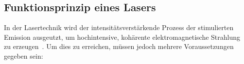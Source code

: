    
    \subsection{Funktionsprinzip eines Lasers}
        In der Lasertechnik wird der intensitätsverstärkende Prozess der stimulierten Emission ausgeutzt, um hochintensive, kohärente elektromagnetische Strahlung zu erzeugen~\cite[401 f.]{haken_wolf_2004}.
        Um dies zu erreichen, müssen jedoch mehrere Voraussetzungen gegeben sein:
